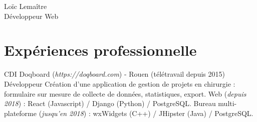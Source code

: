 \documentclass[10pt]{article} %
\begin{document}
\begin{paracol}{2} %


  \parbox[top][0.12\textheight][c]{\linewidth}{ %
    \vspace{-0.04\textheight} %
    \centering %
    {\sffamily\Huge Loïc Lemaître}\\\medskip %
    {\Huge\color{headings}\cvtextfont Développeur Web}
  }


  \section{Expériences professionnelle}





  {CDI} %
  {Doqboard {\small(\textit{https://doqboard.com})} {\small- Rouen (télétravail depuis 2015)}} %
  {Développeur} %
  { Création d'une application de gestion de projets en chirurgie : formulaire sur mesure de collecte de données, statistiques, export. Web {\small(\textit{depuis 2018})} : React (Javascript) / Django (Python) / PostgreSQL. Bureau multi-plateforme {\small(\textit{jusqu'en 2018})} : wxWidgets (C++) / JHipster (Java) / PostgreSQL.
  } %



\end{paracol}
\end{document}
